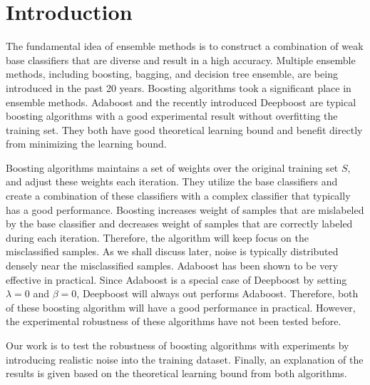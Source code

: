 \section{Introduction}
The fundamental idea of ensemble methods is to construct a combination of weak base classifiers that are diverse and result in a high accuracy.
Multiple ensemble methods, including boosting\cite{}, bagging\cite{}, and decision tree ensemble\cite{}, are being introduced in the past 20 years.
Boosting algorithms took a significant place in ensemble methods. Adaboost\cite{freund1997decision} and the recently introduced Deepboost\cite{cortes2014deep}
are typical boosting algorithms with a good experimental result without overfitting the training set. They both have good theoretical learning bound
and benefit directly from minimizing the learning bound.

Boosting algorithms maintains a set of weights over the original training set $S$, and adjust these weights each iteration.
They utilize the base classifiers and create a combination of these classifiers with a complex classifier that typically has a good performance.
Boosting increases weight of samples that are mislabeled by the base classifier and decreases weight of samples that are correctly labeled during each iteration.
Therefore, the algorithm will keep focus on the misclassified samples.
As we shall discuss later, noise is typically distributed densely near the misclassified samples.
Adaboost has been shown to be very effective in practical\cite{quinlan1996bagging}.
Since Adaboost is a special case of Deepboost by setting $\lambda=0$ and $\beta=0$, Deepboost will always out performs Adaboost.
Therefore, both of these boosting algorithm will have a good performance in practical.
However, the experimental robustness of these algorithms have not been tested before.

Our work is to test the robustness of boosting algorithms with experiments by introducing realistic noise into the training dataset.
Finally, an explanation of the results is given based on the theoretical learning bound from both algorithms.

